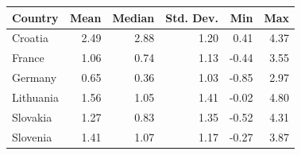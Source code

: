\begin{tabular}{lrrrrr}
\hline
Country & Mean & Median & Std. Dev. & Min & Max \\
\hline
Croatia & 2.49 & 2.88 & 1.20 & 0.41 & 4.37 \\
France & 1.06 & 0.74 & 1.13 & -0.44 & 3.55 \\
Germany & 0.65 & 0.36 & 1.03 & -0.85 & 2.97 \\
Lithuania & 1.56 & 1.05 & 1.41 & -0.02 & 4.80 \\
Slovakia & 1.27 & 0.83 & 1.35 & -0.52 & 4.31 \\
Slovenia & 1.41 & 1.07 & 1.17 & -0.27 & 3.87 \\
\hline
\end{tabular}
